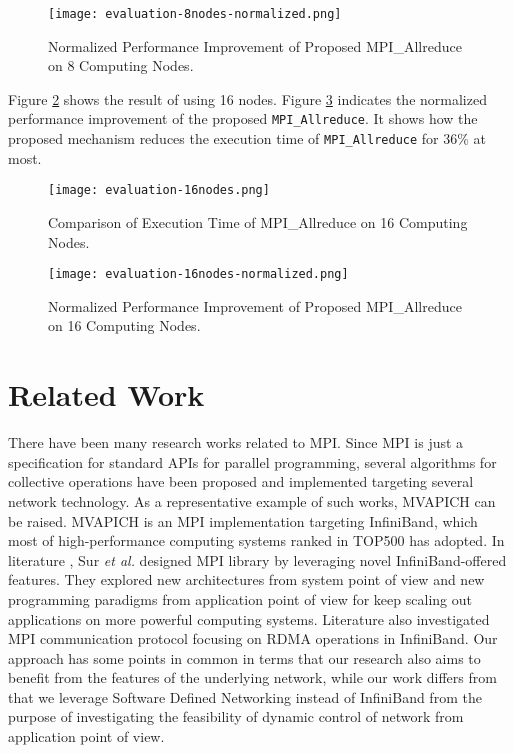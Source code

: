 \begin{figure}[htbp]
    \centering
    \texttt{[image: evaluation-8nodes-normalized.png]}
    \caption{Normalized Performance Improvement of Proposed MPI\_Allreduce on 8 Computing Nodes.}
    \label{fig-evaluation-8nodes-normalized}
\end{figure}

Figure \ref{fig-evaluation-16nodes} shows the result of using 16 nodes.
Figure \ref{fig-evaluation-16nodes-normalized} indicates the normalized
performance improvement of the proposed \texttt{MPI\_Allreduce}. It
shows how the proposed mechanism reduces the execution time of
\texttt{MPI\_Allreduce} for 36\% at most.

\begin{figure}[htbp]
    \centering
    \texttt{[image: evaluation-16nodes.png]}
    \caption{Comparison of Execution Time of MPI\_Allreduce on 16 Computing Nodes.}
    \label{fig-evaluation-16nodes}
\end{figure}

\begin{figure}[htbp]
    \centering
    \texttt{[image: evaluation-16nodes-normalized.png]}
    \caption{Normalized Performance Improvement of Proposed MPI\_Allreduce on 16 Computing Nodes.}
    \label{fig-evaluation-16nodes-normalized}
\end{figure}

\hypertarget{related-work}{%
\section{Related Work}\label{related-work}}

There have been many research works related to MPI. Since MPI is just a
specification for standard APIs for parallel programming, several
algorithms for collective operations have been proposed and implemented
targeting several network technology. As a representative example of
such works, MVAPICH \cite{mvapich} can be raised. MVAPICH is an MPI
implementation targeting InfiniBand, which most of high-performance
computing systems ranked in TOP500 has adopted. In literature
\cite{PjesivacGrbovic2011}, Sur \emph{et al.} designed MPI library by
leveraging novel InfiniBand-offered features. They explored new
architectures from system point of view and new programming paradigms
from application point of view for keep scaling out applications on more
powerful computing systems. Literature \cite{Jiuxing2004} also
investigated MPI communication protocol focusing on RDMA operations in
InfiniBand. Our approach has some points in common in terms that our
research also aims to benefit from the features of the underlying
network, while our work differs from that we leverage Software Defined
Networking instead of InfiniBand from the purpose of investigating the
feasibility of dynamic control of network from application point of
view.

